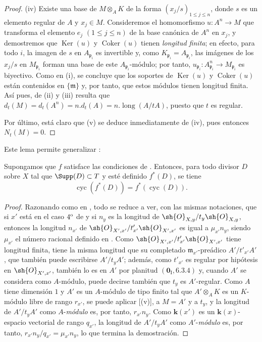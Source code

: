 \begin{proof}
(iv) Existe una base de $M\otimes_AK$ de la forma $(x_j/s)_{1\leq j\leq n}$, donde $s$ es un elemento regular de $A$ y $x_j\in M$.
Consideremos el homomorfismo $u:A^n\to M$ que transforma el elemento $e_j$ $(1\leq j\leq n)$ de la base canónica de $A^n$ en $x_j$, y demostremos que $\operatorname{Ker}(u)$ y $\operatorname{Coker}(u)$ tienen \emph{longitud finita};
en efecto, para todo $i$, la imagen de $s$ en $A_{\mathfrak{p}_i}$ es invertible y, como $K_{\mathfrak{p}_i}=A_{\mathfrak{p}_i}$, las imágenes de los $x_j/s$ en $M_{\mathfrak{p}_i}$ forman una base de este $A_{\mathfrak{p}_i}$-módulo;
por tanto, $u_{\mathfrak{p}_i}:A_{\mathfrak{p}_i}^n\to M_{\mathfrak{p}_i}$ es biyectivo.
Como en (i), se concluye que los soportes de $\operatorname{Ker}(u)$ y $\operatorname{Coker}(u)$ están contenidos en $\{\mathfrak{m}\}$ y, por tanto, que estos módulos tienen longitud finita.
Así pues, de (ii) y (iii) resulta que $d_t(M)=d_t(A^n)=n.d_t(A)=n.\operatorname{long}(A/tA)$, puesto que $t$ es regular.

Por último, está claro que (v) se deduce inmediatamente de (iv), pues entonces $N_t(M)=0$.
\end{proof}

Este lema permite generalizar :

\begin{proposition}[21.10.13]
\label{IV.21.10.13bis}
Supongamos que $f$ satisface las condiciones de .
Entonces, para todo divisor $D$ sobre $X$ tal que $\Supp(D)\subset T$ y esté definido $f^*(D)$, se tiene
\[
\label{IV.21.10.13.1}
  \operatorname{cyc}(f^*(D))=f^*(\operatorname{cyc}(D)).
  \tag{21.10.13.1}
\]
\end{proposition}

\begin{proof}
Razonando como en , todo se reduce a ver, con las mismas notaciones, que si $x'$ está en el caso $4\textsuperscript{o}$ de  y si $n_y$ es la longitud de $\sh{O}_{X,y}/t_y\sh{O}_{X,y}$, entonces la
longitud $n_{x'}$ de $\sh{O}_{X',x'}/t'_{x'}\sh{O}_{X',x'}$ es igual a $\mu_{x'}n_y$, siendo $\mu_{x'}$ el número racional definido en .
Como $\sh{O}_{X',x'}/t'_{x'}\sh{O}_{X',x'}$ tiene longitud finita, tiene la misma longitud que su completado $\mathfrak{m}_{x'}$-preádico $A'/t'_{x'}A'$, que también puede escribirse $A'/t_yA'$;
además, como $t'_{x'}$ es regular por hipótesis en $\sh{O}_{X',x'}$, también lo es en $A'$ por planitud $(\mathbf{0}_{\mathrm{I}},6.3.4)$ y, cuando $A'$ se considera como $A$-módulo, puede decirse también que $t_y$ es $A'$-regular.
Como $A$ tiene dimensión $1$ y $A'$ es un $A$-módulo de tipo finito tal que $A'\otimes_AK$ es un $K$-módulo libre de rango $r_{x'}$, se puede aplicar [(v)], a $M=A'$ y a $t_y$, y la longitud de $A'/t_yA'$ como $A$-\emph{módulo} es, por tanto, $r_{x'}n_y$.
Como $\boldsymbol{k}(x')$ es un $\boldsymbol{k}(x)$-espacio vectorial de rango $q_{x'}$, la longitud de $A'/t_yA'$ como $A'$-\emph{módulo} es, por tanto, $r_{x'}n_y/q_{x'}=\mu_{x'}n_y$, lo que termina la demostración.
\end{proof}

